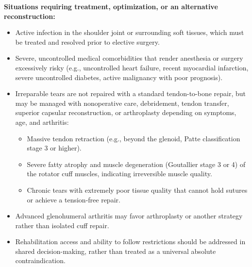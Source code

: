 \textbf{Situations requiring treatment, optimization, or an alternative reconstruction:}
\begin{itemize}
  \item Active infection in the shoulder joint or surrounding soft tissues, which must be treated and resolved prior to elective surgery.
  \item Severe, uncontrolled medical comorbidities that render anesthesia or surgery excessively risky (e.g., uncontrolled heart failure, recent myocardial infarction, severe uncontrolled diabetes, active malignancy with poor prognosis).
  \item Irreparable tears are not repaired with a standard tendon-to-bone repair, but may be managed with nonoperative care, debridement, tendon transfer, superior capsular reconstruction, or arthroplasty depending on symptoms, age, and arthritis:
    \begin{itemize}
      \item Massive tendon retraction (e.g., beyond the glenoid, Patte classification stage 3 or higher).
      \item Severe fatty atrophy and muscle degeneration (Goutallier stage 3 or 4) of the rotator cuff muscles, indicating irreversible muscle quality.
      \item Chronic tears with extremely poor tissue quality that cannot hold sutures or achieve a tension-free repair.
    \end{itemize}
  \item Advanced glenohumeral arthritis may favor arthroplasty or another strategy rather than isolated cuff repair.
  \item Rehabilitation access and ability to follow restrictions should be addressed in shared decision-making, rather than treated as a universal absolute contraindication.
\end{itemize}

